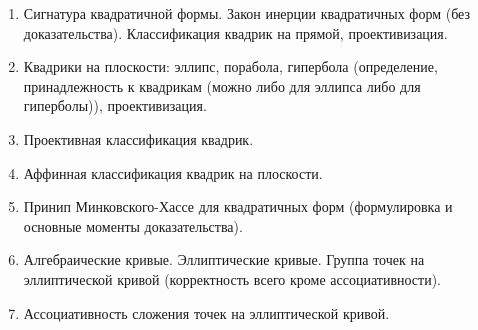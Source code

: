 \documentclass[12pt]{article}
\begin{document}
\begin{enumerate}
    \item Сигнатура квадратичной формы. Закон инерции квадратичных форм (без доказательства). Классификация квадрик на прямой, проективизация.

    \item  Квадрики на плоскости: эллипс, порабола, гипербола (определение, принадлежность к квадрикам (можно либо для эллипса либо для гиперболы)), проективизация.

    \item Проективная классификация квадрик.

    \item Аффинная классификация квадрик на плоскости.

    \item Принип Минковского-Хассе для квадратичных форм (формулировка и основные моменты доказательства).

    \item Алгебраические кривые. Эллиптические кривые. Группа точек на эллиптической кривой (корректность всего кроме ассоциативности).

    \item Ассоциативность сложения точек на эллиптической кривой.

\end{enumerate}
\end{document}
